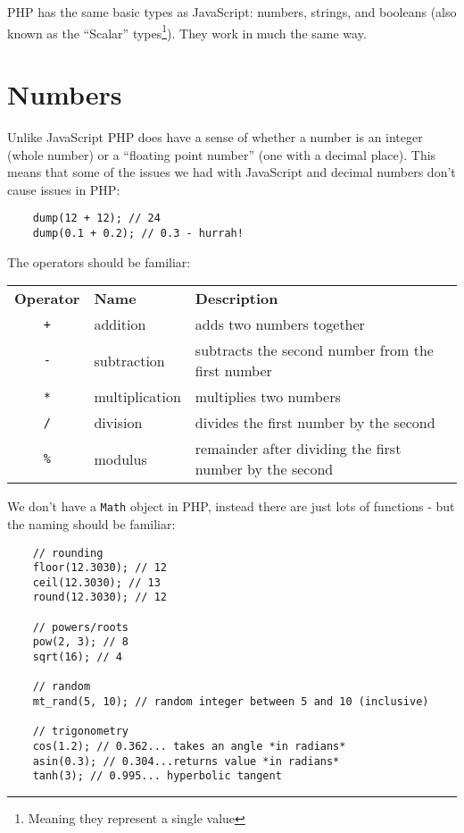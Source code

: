 PHP has the same basic types as JavaScript: numbers, strings, and booleans (also known as the ``Scalar'' types\footnote{Meaning they represent a single value}). They work in much the same way.


\section{Numbers}

Unlike JavaScript PHP does have a sense of whether a number is an integer (whole number) or a ``floating point number'' (one with a decimal place). This means that some of the issues we had with JavaScript and decimal numbers don't cause issues in PHP:

\begin{verbatim}
    dump(12 + 12); // 24
    dump(0.1 + 0.2); // 0.3 - hurrah!
\end{verbatim}


The operators should be familiar:
\\

\begin{small}
    \begin{tabularx}{\textwidth}{c l X}
        \textbf{Operator} & \textbf{Name} & \textbf{Description} \\
        \texttt{+}  & addition        & adds two numbers together \\
        \texttt{-}  & subtraction     & subtracts the second number from the first number \\
        \texttt{*}  & multiplication  & multiplies two numbers \\
        \texttt{/}  & division        & divides the first number by the second \\
        \texttt{\%} & modulus         & remainder after dividing the first number by the second
    \end{tabularx}
\end{small}

\pagebreak

We don't have a \texttt{Math} object in PHP, instead there are just lots of functions - but the naming should be familiar:

\begin{verbatim}
    // rounding
    floor(12.3030); // 12
    ceil(12.3030); // 13
    round(12.3030); // 12

    // powers/roots
    pow(2, 3); // 8
    sqrt(16); // 4

    // random
    mt_rand(5, 10); // random integer between 5 and 10 (inclusive)

    // trigonometry
    cos(1.2); // 0.362... takes an angle *in radians*
    asin(0.3); // 0.304...returns value *in radians*
    tanh(3); // 0.995... hyperbolic tangent
\end{verbatim}


